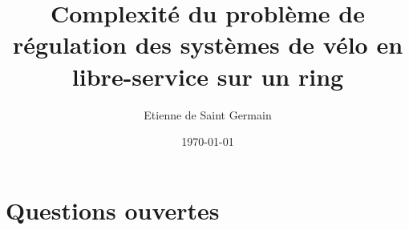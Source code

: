 \documentclass[twoside,11pt,openany,a4paper]{rapport}
\begin{document}
\title{Complexité du problème de régulation des systèmes de vélo en libre-service sur un ring}
\author{Etienne de Saint Germain}
\date{\today}



\cleardoublepage







\tableofcontents
{}
\listoffigures
{}



\cleardoublepage











\chapter{Questions ouvertes}




\backmatter


\end{document}

